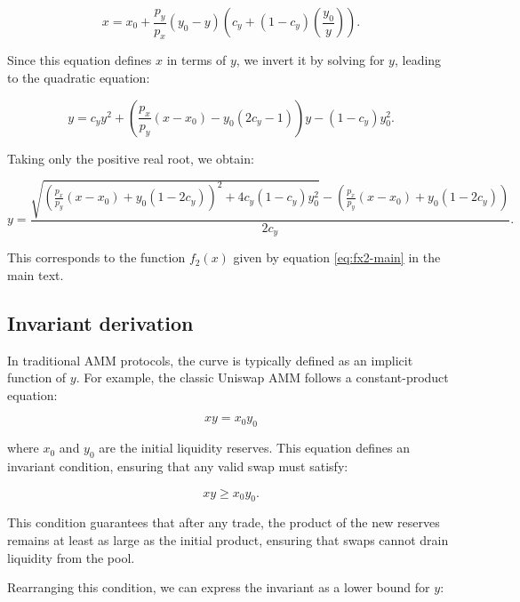 \documentclass{article}
\begin{document}
\begin{equation}
    \label{eq:EulerSwap-3-inverse}
    x = x_0 + \frac{p_y}{p_x} (y_0 - y) \left( c_y + (1 - c_y) \left(\frac{y_0}{y}\right) \right).
\end{equation}

Since this equation defines \( x \) in terms of \( y \), we invert it by solving for \( y \), leading to the quadratic equation:

\begin{equation}
    y = c_y y^2 + \left( \frac{p_x}{p_y} (x - x_0) - y_0(2c_y - 1) \right)y - (1 - c_y) y_0^2.
\end{equation}

Taking only the positive real root, we obtain:

\begin{equation}
    \label{eq:EulerSwap-2}
    y = \frac{
        \sqrt{
            \left( \frac{p_x}{p_y} (x - x_0) + y_0 (1 - 2c_y) \right)^2 
            + 4c_y (1 - c_y) y_0^2
        } 
        - \left( \frac{p_x}{p_y} (x - x_0) + y_0 (1 - 2c_y) \right)
    }{2c_y}.
\end{equation}

This corresponds to the function \( f_2(x) \) given by equation \eqref{eq:fx2-main} in the main text.

\subsection{Invariant derivation}
\label{sec:invariant-derivation}

In traditional AMM protocols, the curve is typically defined as an implicit function of $y$. For example, the classic Uniswap AMM follows a constant-product equation:

\begin{equation}
    xy = x_0 y_0
\end{equation}

where $x_0$ and $y_0$ are the initial liquidity reserves. This equation defines an invariant condition, ensuring that any valid swap must satisfy:

\begin{equation}
    xy \geq x_0 y_0.
\end{equation}

This condition guarantees that after any trade, the product of the new reserves remains at least as large as the initial product, ensuring that swaps cannot drain liquidity from the pool.

Rearranging this condition, we can express the invariant as a lower bound for $y$:
\end{document}
